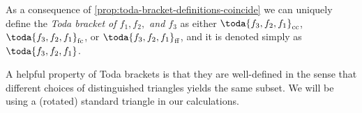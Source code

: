 As a consequence of \autoref{prop:toda-bracket-definitions-coincide} we can uniquely define the \emph{Toda bracket of \( f_1, f_2, \) and \( f_3 \)} as either \( \toda{f_3, f_2, f_1}_{\cc} \), \( \toda{f_3, f_2, f_1}_{\fc} \), or \( \toda{f_3, f_2, f_1}_{\ff} \), and it is denoted simply as \emph{\( \toda{f_3, f_2, f_1} \)}.

A helpful property of Toda brackets is that they are well-defined in the sense that different choices of distinguished triangles yields the same subset. We will be using a (rotated) standard triangle in our calculations.

